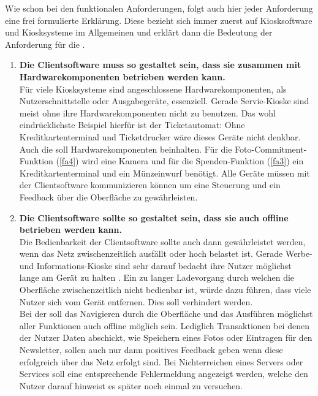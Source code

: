 Wie schon bei den funktionalen Anforderungen, folgt auch hier jeder Anforderung eine frei formulierte Erklärung. 
Diese bezieht sich immer zuerst auf Kiosksoftware und Kiosksysteme im Allgemeinen und erklärt dann die Bedeutung
der Anforderung für die \shst{}.

\begin{enumerate}[label=\textbf{NFA\arabic*}]
	\item\label{nfa1} \textbf{Die Clientsoftware muss so gestaltet sein, dass sie zusammen mit Hardwarekomponenten 
  betrieben werden kann.}\\
  Für viele Kiosksysteme sind angeschlossene Hardwarekomponenten, als Nutzerschnittstelle oder Ausgabegeräte, essenziell.
  Gerade Servie-Kioske sind meist ohne ihre Hardwarekomponenten nicht zu benutzen. Das wohl eindrücklichste
  Beispiel hierfür ist der Ticketautomat: Ohne Kreditkartenterminal und Ticketdrucker wäre dieses Geräte nicht denkbar.\\
  Auch die \shst{} soll Hardwarekomponenten beinhalten. Für die Foto-Commitment-Funktion (\ref{fa4}) wird eine
  Kamera und für die Spenden-Funktion (\ref{fa3}) ein Kreditkartenterminal und ein Münzeinwurf benötigt. Alle 
  Geräte müssen mit der Clientsoftware kommunizieren können um eine Steuerung und ein Feedback über die Oberfläche
  zu gewährleisten. 
	\item\label{nfa2} \textbf{Die Clientsoftware sollte so gestaltet sein, dass sie auch offline 
  betrieben werden kann.}\\
  Die Bedienbarkeit der Clientsoftware sollte auch dann gewährleistet werden, wenn das Netz zwischenzeitlich
  ausfällt oder hoch belastet ist. Gerade Werbe- und Informations-Kioske sind sehr darauf bedacht ihre
  Nutzer möglichst lange am Gerät zu halten \cite{across}. Ein zu langer Ladevorgang durch welchen die 
  Oberfläche zwischenzeitlich nicht bedienbar ist, würde dazu führen, dass viele Nutzer sich 
  vom Gerät entfernen. Dies soll verhindert werden.\\
  Bei der \shst{} soll das Navigieren durch die Oberfläche und das Ausführen möglichst aller Funktionen 
  auch offline möglich sein. Lediglich Transaktionen bei denen der Nutzer Daten abschickt, wie Speichern 
  eines Fotos oder Eintragen für den Newsletter, sollen auch nur dann positives Feedback geben wenn 
  diese erfolgreich über das Netz erfolgt sind. Bei Nichterreichen eines Servers oder Services soll eine entsprechende
  Fehlermeldung angezeigt werden, welche den Nutzer darauf hinweist es später noch einmal zu versuchen.

\end{enumerate}
